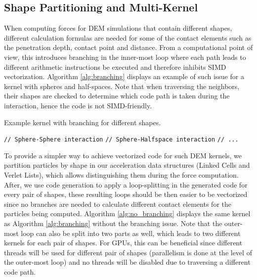 \documentclass[preprint,12pt]{elsarticle}
\begin{document}
\subsection{Shape Partitioning and Multi-Kernel}
\label{sec:shape_partitioning}

When computing forces for DEM simulations that contain different shapes, different calculation formulas are needed for some of the contact elements such as the penetration depth, contact point and distance.
From a computational point of view, this introduces branching in the inner-most loop where each path leads to different arithmetic instructions be executed and therefore inhibits SIMD vectorization.
Algorithm \autoref{alg:branching} displays an example of such issue for a kernel with spheres and half-spaces.
Note that when traversing the neighbors, their shapes are checked to determine which code path is taken during the interaction, hence the code is not SIMD-friendly.

\begin{algorithm}[H]
  \caption{Example kernel with branching for different shapes.}
  \label{alg:branching}
  \begin{algorithmic}[1]
          \State \texttt{// Sphere-Sphere interaction}
        \EndIf
          \State \texttt{// Sphere-Halfspace interaction}
        \EndIf
        \State \texttt{// ...}
      \EndFor
    \EndFor
  \end{algorithmic}
\end{algorithm}

To provide a simpler way to achieve vectorized code for such DEM kernels, we partition particles by shape in our acceleration data structures (Linked Cells and Verlet Lists), which allows distinguishing them during the force computation.
After, we use code generation to apply a loop-splitting in the generated code for every pair of shapes, these resulting loops should be then easier to be vectorized since no branches are needed to calculate different contact elements for the particles being computed.
Algorithm \autoref{alg:no_branching} displays the same kernel as Algorithm \autoref{alg:branching} without the branching issue.
Note that the outer-most loop can also be split into two parts as well, which leads to two different kernels for each pair of shapes.
For GPUs, this can be beneficial since different threads will be used for different pair of shapes (parallelism is done at the level of the outer-most loop) and no threads will be disabled due to traversing a different code path.
\end{document}
